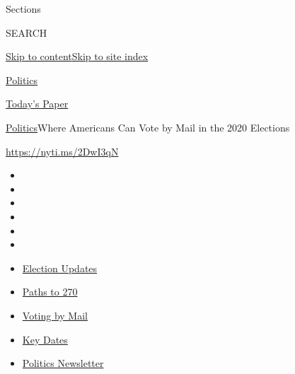 Sections

SEARCH

\protect\hyperlink{site-content}{Skip to
content}\protect\hyperlink{site-index}{Skip to site index}

\href{https://www.nytimes3xbfgragh.onion/section/politics}{Politics}

\href{https://myaccount.nytimes3xbfgragh.onion/auth/login?response_type=cookie\&client_id=vi}{}

\href{https://www.nytimes3xbfgragh.onion/section/todayspaper}{Today's
Paper}

\href{/section/politics}{Politics}\textbar{}Where Americans Can Vote by
Mail in the 2020 Elections

\url{https://nyti.ms/2DwI3qN}

\begin{itemize}
\item
\item
\item
\item
\item
\item
\end{itemize}

\begin{itemize}
\item
  \href{https://www.nytimes3xbfgragh.onion/live/2020/09/07/us/trump-vs-biden?action=click\&pgtype=Article\&state=default\&region=TOP_BANNER\&context=storylines_menu}{Election
  Updates}
\item
  \href{https://www.nytimes3xbfgragh.onion/interactive/2020/us/elections/election-states-biden-trump.html?action=click\&pgtype=Article\&state=default\&region=TOP_BANNER\&context=storylines_menu}{Paths
  to 270}
\item
  \href{https://www.nytimes3xbfgragh.onion/interactive/2020/08/31/us/politics/vote-by-mail-deadlines.html?action=click\&pgtype=Article\&state=default\&region=TOP_BANNER\&context=storylines_menu}{Voting
  by Mail}
\item
  \href{https://www.nytimes3xbfgragh.onion/interactive/2019/us/elections/2020-presidential-election-calendar.html?action=click\&pgtype=Article\&state=default\&region=TOP_BANNER\&context=storylines_menu}{Key
  Dates}
\item
  \href{https://www.nytimes3xbfgragh.onion/newsletters/politics?action=click\&pgtype=Article\&state=default\&region=TOP_BANNER\&context=storylines_menu}{Politics
  Newsletter}
\end{itemize}

